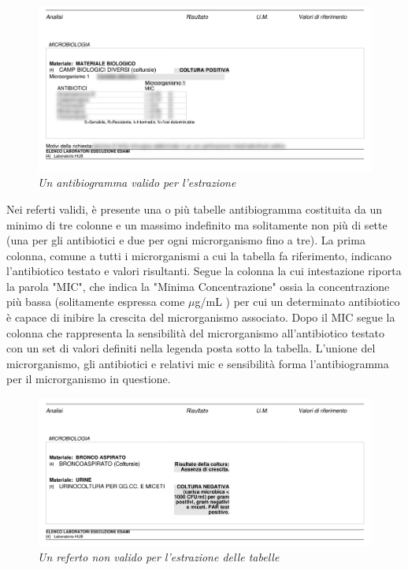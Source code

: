 \begin{figure}[h!]
	\centering
	\includegraphics[width=.99\columnwidth]{images/content.png}
	\caption{\textit{Un antibiogramma valido per l'estrazione}}
	\label{fig:content}
\end{figure}
\bigskip
Nei referti validi, è presente una o più tabelle antibiogramma costituita da un minimo di tre colonne e un massimo indefinito ma solitamente non più di sette (una per gli antibiotici e due per ogni microrganismo fino a tre).
La prima colonna, comune a tutti i microrganismi a cui la tabella fa riferimento, indicano l'antibiotico testato e valori risultanti.
Segue la colonna la cui intestazione riporta la parola "MIC", che indica la "Minima Concentrazione" ossia la concentrazione più bassa (solitamente espressa come $\mu$g/mL ) per cui un determinato antibiotico è capace di inibire la crescita del microrganismo associato.
Dopo il MIC segue la colonna che rappresenta la sensibilità del microrganismo all'antibiotico testato con un set di valori definiti nella legenda posta sotto la tabella.
L'unione del microrganismo, gli antibiotici e relativi mic e sensibilità forma l'antibiogramma per il microrganismo in questione.

\begin{figure}[h!]
	\centering
	\includegraphics[width=.99\columnwidth]{images/content_senza.png}
	\caption{\textit{Un referto non valido per l'estrazione delle tabelle}}
	\label{fig:content_senza}
\end{figure}

